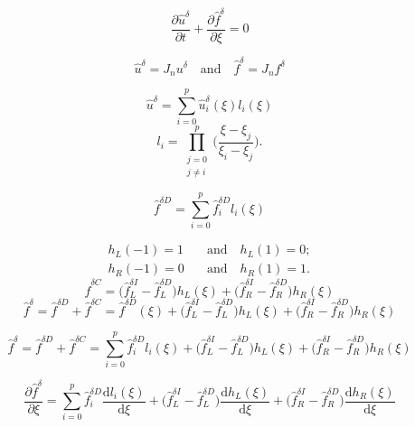\documentclass[12pt]{article}
\newcommand{\hfd}{\hat{f}^{\delta}}
\newcommand{\hfI}{\hat{f}^{\delta I}}
\newcommand{\hfC}{\hat{f}^{\delta C}}
\newcommand{\hfD}{\hat{f}^{\delta D}}
\newcommand{\hud}{\hat{u}^{\delta}}
\newcommand\px[2]{\frac{\partial #1}{\partial {#2}}}
\newcommand\dx[2]{\frac{\mathrm{d} #1}{\mathrm{d} #2}}
\begin{document}
	\begin{equation}
		\px{\hud}{t} + \px{\hfd}{\xi} = 0
	\end{equation}
	
	\begin{equation}
		\hud = J_n u^\delta \quad \mathrm{and} \quad \hfd = J_n f^\delta 
	\end{equation}
	
	\begin{equation}
		\hud = \sum^p_{i=0}\hud_i(\xi) l_i(\xi)
	\end{equation}
	\begin{equation}
		l_i = \prod^p_{\substack{j=0\\j\ne i}}\bigg(\frac{\xi-\xi_j}{\xi_i-\xi_j}\bigg).
	\end{equation}
	
	\begin{equation}
		\hfD = \sum^{p}_{i=0} \hfD_il_i(\xi)
	\end{equation}
	
	\begin{align}
		h_L(-1) = 1 \quad &\mathrm{and} \quad h_L(1) = 0; \\
		h_R(-1) = 0 \quad &\mathrm{and} \quad h_R(1) = 1.
	\end{align}
	\begin{equation}
		\hfC = \Big(\hfI_L - \hfD_L\Big)h_L(\xi) + \Big(\hfI_R - \hfD_R\Big)h_R(\xi)
	\end{equation}
	\begin{equation}
		\hfd = \hfD + \hfC = \hfD(\xi) + \Big(\hfI_L - \hfD_L\Big)h_L(\xi) + \Big(\hfI_R - \hfD_R\Big)h_R(\xi)
	\end{equation}
	
	\begin{equation}
		\hfd = \hfD + \hfC = \sum^{p}_{i=0}\hfD_il_i(\xi) + \Big(\hfI_L - \hfD_L\Big)h_L(\xi) + \Big(\hfI_R - \hfD_R\Big)h_R(\xi)
	\end{equation}
	
	\begin{equation}
		\px{\hfd}{\xi} = \sum^{p}_{i=0}\hfD_i\dx{l_i(\xi)}{\xi} + \Big(\hfI_L - \hfD_L\Big)\dx{h_L(\xi)}{\xi} + \Big(\hfI_R - \hfD_R\Big)\dx{h_R(\xi)}{\xi}
	\end{equation}
\end{document}
